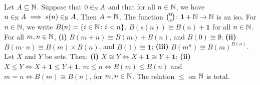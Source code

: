 Let $A \subseteq \operatorname{\mathbb{N}}$. Suppose that $0 \in_{\operatorname{\mathbb{N}}} A$ and that for all $n \in \operatorname{\mathbb{N}}$, we have $n \in_{\operatorname{\mathbb{N}}} A \implies s(n) \in_{\operatorname{\mathbb{N}}} A$. Then $A = \operatorname{\mathbb{N}}$.
 The function $\binom{0}{s} \colon \mathbf{1} + \operatorname{\mathbb{N}} \to \operatorname{\mathbb{N}}$ is an iso.
 For $n \in \operatorname{\mathbb{N}}$, we write $B(n) = \{ i \in \operatorname{\mathbb{N}} \colon i < n \}$.
 $B(s(n)) \cong B(n) + \mathbf{1}$ for all $n \in \operatorname{\mathbb{N}}$.
 For all $m, n \in \operatorname{\mathbb{N}}$, \textbf{(i)} $B(m + n) \cong B(m) + B(n)$, and $B(0) \cong \emptyset$; \textbf{(ii)} $B(m \cdot n) \cong B(m) \times B(n)$, and $B(1) \cong \mathbf{1}$; \textbf{(iii)} $B(m^n) \cong B(m)^{B(n)}$.
 Let $X$ and $Y$ be sets. Then: \textbf{(i)} $X \cong Y \iff X + \mathbf{1} \cong Y + \mathbf{1}$; \textbf{(ii)} $X \leq Y \iff X + \mathbf{1} \leq Y + \mathbf{1}$.
 $m \leq n \iff B(m) \leq B(n)$ and $m = n \iff B(m) \cong B(n)$, for $m, n \in \operatorname{\mathbb{N}}$.
 The relation $\leq$ on $\operatorname{\mathbb{N}}$ is total.
